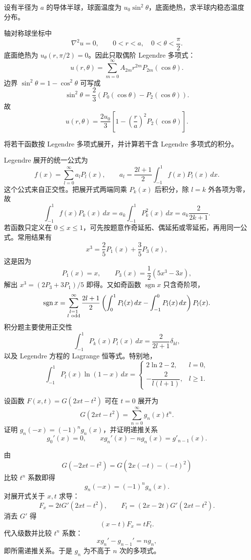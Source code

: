 ﻿


\begin{question}
设有半径为 \(a\) 的导体半球，球面温度为 \(u_0\sin^2\theta\)，底面绝热，求半球内稳态温度分布。
\begin{solution}
轴对称球坐标中
\[
\nabla^2u=0,\qquad 0<r<a,\quad 0<\theta<\frac\pi2.
\]
底面绝热为 \(u_\theta(r,\pi/2)=0\)。因此只取偶阶 Legendre 多项式：
\[
u(r,\theta)=\sum_{m=0}^{\infty}A_{2m}r^{2m}P_{2m}(\cos\theta).
\]
边界 \(\sin^2\theta=1-\cos^2\theta\) 可写成
\[
\sin^2\theta=\frac23\left(P_0(\cos\theta)-P_2(\cos\theta)\right).
\]
故
\[
u(r,\theta)=\frac{2u_0}{3}
\left[1-\left(\frac ra\right)^2P_2(\cos\theta)\right].
\]
\end{solution}
\end{question}

\begin{question}
将若干函数按 Legendre 多项式展开，并计算若干含 Legendre 多项式的积分。
\begin{solution}
Legendre 展开的统一公式为
\[
f(x)=\sum_{l=0}^{\infty}a_lP_l(x),\qquad
a_l=\frac{2l+1}{2}\int_{-1}^{1}f(x)P_l(x)\,dx.
\]
这个公式来自正交性。把展开式两端同乘 \(P_k(x)\) 后积分，除 \(l=k\) 外各项为零，故
\[
\int_{-1}^{1}f(x)P_k(x)\,dx
=a_k\int_{-1}^{1}P_k^2(x)\,dx
=a_k\frac{2}{2k+1}.
\]
若函数只定义在 \(0\le x\le1\)，可先按题意作奇延拓、偶延拓或零延拓，再用同一公式。常用结果有
\[
x^3=\frac25P_1(x)+\frac35P_3(x),
\]
这是因为
\[
P_1(x)=x,\qquad P_3(x)=\frac12(5x^3-3x),
\]
解出 \(x^3=(2P_3+3P_1)/5\) 即得。又如奇函数 \(\operatorname{sgn}x\) 只含奇阶项，
\[
\operatorname{sgn}x=\sum_{\substack{l=1\\ l\ {\rm odd}}}^{\infty}
\frac{2l+1}{2}\left(\int_0^1P_l(x)\,dx-\int_{-1}^0P_l(x)\,dx\right)P_l(x).
\]
积分题主要使用正交性
\[
\int_{-1}^{1}P_k(x)P_l(x)\,dx=\frac{2}{2l+1}\delta_{kl},
\]
以及 Legendre 方程的 Lagrange 恒等式。特别地，
\[
\int_{-1}^{1}P_l(x)\ln(1-x)\,dx
=
\begin{cases}
2\ln2-2,&l=0,\\
-\dfrac{2}{l(l+1)},&l\ge1.
\end{cases}
\]
\end{solution}
\end{question}

\begin{question}
设函数 \(F(x,t)=G(2xt-t^2)\) 可在 \(t=0\) 展开为
\[
G(2xt-t^2)=\sum_{n=0}^{\infty}g_n(x)t^n.
\]
证明 \(g_n(-x)=(-1)^ng_n(x)\)，并证明递推关系
\[
g_0'(x)=0,\qquad xg_n'(x)-ng_n(x)=g'_{n-1}(x).
\]
\begin{solution}
由
\[
G(-2xt-t^2)=G(2x(-t)-(-t)^2)
\]
比较 \(t^n\) 系数即得
\[
g_n(-x)=(-1)^ng_n(x).
\]
对展开式关于 \(x,t\) 求导：
\[
F_x=2tG'(2xt-t^2),\qquad
F_t=(2x-2t)G'(2xt-t^2).
\]
消去 \(G'\) 得
\[
(x-t)F_x=tF_t.
\]
代入级数并比较 \(t^n\) 系数：
\[
xg_n'-g_{n-1}'=ng_n,
\]
即所需递推关系。于是 \(g_n\) 为不高于 \(n\) 次的多项式。
\end{solution}
\end{question}

